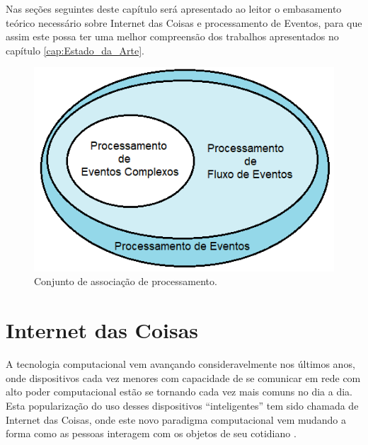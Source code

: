 \documentclass[ti,table]{texufpel} %
\begin{document}
Nas seções seguintes deste capítulo será apresentado ao leitor o embasamento teórico necessário sobre Internet das Coisas e processamento de Eventos, para que assim este possa ter uma melhor compreensão dos trabalhos apresentados no capítulo \ref{cap:Estado_da_Arte}. 

  

  

\begin{figure}[ht] 

    \centering 

    \includegraphics[width=.6\textwidth]{imagens/ConjuntoProcessamento.png} 

    \caption{Conjunto de associação de processamento.} 

    \label{fig:ConjuntoProcessamento} 

\end{figure} 

  

  

\section{Internet das Coisas} 

  

A tecnologia computacional vem avançando consideravelmente nos últimos anos, onde dispositivos cada vez menores com capacidade de se comunicar em rede com alto poder computacional estão se tornando cada vez mais comuns no dia a dia. Esta popularização do uso desses dispositivos ``inteligentes'' tem sido chamada de Internet das Coisas, onde este novo paradigma computacional vem mudando a forma como as pessoas interagem com os objetos de seu cotidiano \cite{xavier2016smart}. 

  
\end{document}
